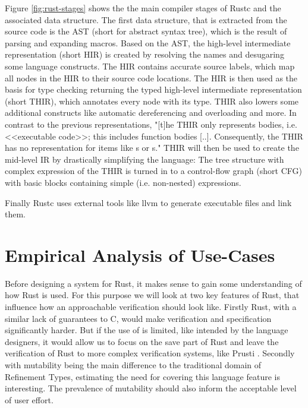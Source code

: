 \documentclass[twoside, english]{sdqthesis}
\theoremstyle{definition}
\begin{document}
Figure \ref{fig:rust-stages} shows the the main compiler stages of Rustc and the associated data structure. The first data structure, that is extracted from the source code is the AST (short for abstract syntax tree), which is the result of parsing and expanding macros. 
Based on the AST, the high-level intermediate representation (short HIR) is created by resolving the names and desugaring some language constructs. The HIR contains accurate source labels, which map all nodes in the HIR to their source code locations. 
The HIR is then used as the basis for type checking returning the typed high-level intermediate representation (short THIR), which annotates every node with its type. THIR also lowers some additional constructs like automatic dereferencing and overloading and more. In contrast to the previous representations, "[t]he THIR only represents bodies, i.e. <<executable code>>; this includes function bodies [..]. Consequently, the THIR has no representation for items like s or s." \cite[p. 1]{noauthor_thir_nodate}
THIR will then be used to create the mid-level IR by drastically simplifying the language: The tree structure with complex expression of the THIR is turned in to a control-flow graph (short CFG) with basic blocks containing simple (i.e. non-nested) expressions.

Finally Rustc uses external tools \- like llvm \- to generate executable files and link them.



\chapter{Empirical Analysis of Use-Cases} \label{ch:analysis} 

Before designing a system for Rust, it makes sense to gain some understanding of how Rust is used. For this purpose we will look at two key features of Rust, that influence how an approachable verification should look like.
Firstly  Rust, with a similar lack of guarantees to C, would make verification and specification significantly harder. But if the use of  is limited, like intended by the language designers, it would allow us to focus on the save part of Rust and leave the verification of  Rust to more complex verification systems, like Prusti \cite{astrauskas_leveraging_2019}.
Secondly with mutability being the main difference to the traditional domain of Refinement Types, estimating the need for covering this language feature is interesting. The prevalence of mutability should also inform the acceptable level of user effort.
\end{document}
